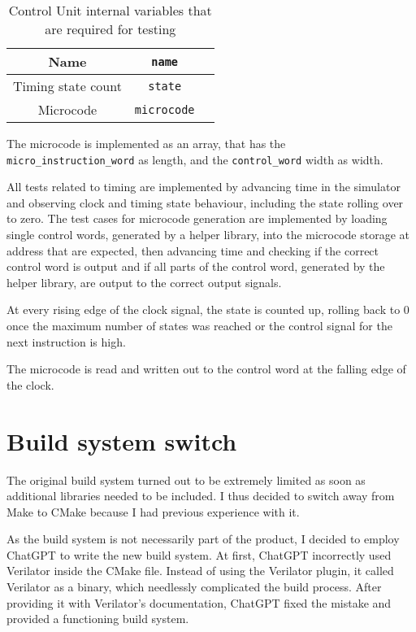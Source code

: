 \begin{table}[H]
  \begin{center}
  \begin{tabular}{ccc}
    Name                                    & \texttt{name}                          \\ \hline
    Timing state count & \texttt{state}                \\
    Microcode          & \texttt{microcode}                \\
  \end{tabular}

\end{center}
  \caption{Control Unit internal variables that are required for testing}
   \label{tab:cu-io}

  \end{table}

The microcode is implemented as an array, that has the \texttt{micro\_instruction\_word} as length, and the \texttt{control\_word} width as width.

All tests related to timing are implemented by advancing time in the simulator and observing clock and timing state behaviour, including the state rolling over to zero. The test cases for microcode generation are implemented by loading single control words, generated by a helper library, into the microcode storage at address that are expected, then advancing time and checking if the correct control word is output and if all parts of the control word, generated by the helper library, are output to the correct output signals. 

At every rising edge of the clock signal, the state is counted up, rolling back to 0 once the maximum number of states was reached or the control signal for the next instruction is high.

The microcode is read and written out to the control word at the falling edge of the clock. 

\section{Build system switch}
The original build system turned out to be extremely limited as soon as additional libraries needed to be included. I thus decided to switch away from Make to CMake because I had previous experience with it.

As the build system is not necessarily part of the product, I decided to employ ChatGPT \cite{chatgptbuildsystem} to write the new build system. At first, ChatGPT incorrectly used Verilator inside the CMake file. Instead of using the Verilator plugin, it called Verilator as a binary, which needlessly complicated the build process. After providing it with Verilator's documentation, ChatGPT fixed the mistake and provided a functioning build system. 

